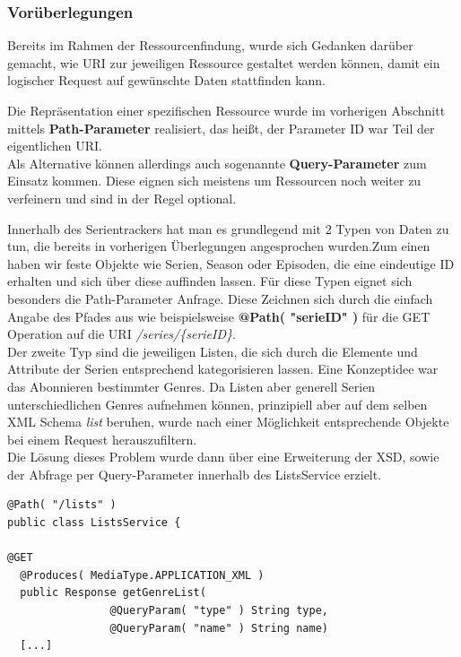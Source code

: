 \documentclass[a4paper]{article}
\begin{document}
\subsubsection{Vorüberlegungen}
Bereits im Rahmen der Ressourcenfindung, wurde sich Gedanken darüber gemacht, wie URI zur jeweiligen Ressource gestaltet werden können, damit ein logischer Request auf gewünschte Daten stattfinden kann.

Die Repräsentation einer spezifischen Ressource wurde im vorherigen Abschnitt mittels \textbf{Path-Parameter} realisiert, das heißt, der Parameter ID war Teil der eigentlichen URI.\\
Als Alternative können allerdings auch sogenannte \textbf{Query-Parameter} zum Einsatz kommen. Diese eignen sich meistens um Ressourcen noch weiter zu verfeinern und sind in der Regel optional.

Innerhalb des Serientrackers hat man es grundlegend mit 2 Typen von Daten zu tun, die bereits in vorherigen Überlegungen angesprochen wurden.Zum einen haben wir feste Objekte wie Serien, Season oder Episoden, die eine eindeutige ID erhalten und sich über diese auffinden lassen. Für diese Typen eignet sich besonders die Path-Parameter Anfrage. 
Diese Zeichnen sich durch die einfach Angabe des Pfades aus wie beispielsweise \textbf{@Path( "{serieID}" )} für die GET Operation auf die URI \textit{/series/\{serieID\}}.\\
Der zweite Typ sind die jeweiligen Listen, die sich durch die Elemente und Attribute der Serien entsprechend kategorisieren lassen. Eine Konzeptidee war das Abonnieren bestimmter Genres. Da Listen aber generell Serien unterschiedlichen Genres aufnehmen können, prinzipiell aber auf dem selben XML Schema \textit{list} beruhen, wurde nach einer Möglichkeit entsprechende Objekte bei einem Request herauszufiltern.\\ Die Lösung dieses Problem wurde dann über eine Erweiterung der XSD, sowie der Abfrage per Query-Parameter innerhalb des ListsService erzielt. 
\begin{lstlisting}[label=listsservice,caption= Auszug aus ListsService mit QueryParam]
@Path( "/lists" )
public class ListsService {

@GET
  @Produces( MediaType.APPLICATION_XML )
  public Response getGenreList( 
                @QueryParam( "type" ) String type,
                @QueryParam( "name" ) String name) 
  [...]
\end{lstlisting}
\end{document}
